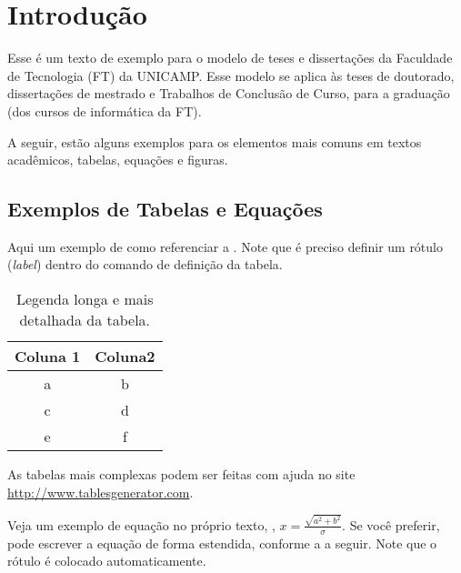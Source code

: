 \chapter{Introdução}\label{chp:Introducao}

Esse é um texto de exemplo para o modelo de teses e dissertações da Faculdade de Tecnologia (FT) da UNICAMP. Esse modelo se aplica às teses de doutorado, dissertações de mestrado e Trabalhos de Conclusão de Curso, para a graduação (dos cursos de informática da FT).

A seguir, estão alguns exemplos para os elementos mais comuns em textos acadêmicos, \ie tabelas, equações e figuras. 

\section{Exemplos de Tabelas e Equações}\label{sec:exemplostabelas}
Aqui um exemplo de como referenciar a . Note que é preciso definir um rótulo (\textit{label}) dentro do comando de definição da tabela.

\begin{table}[!htp]
\caption[Legenda curta da tabela]{Legenda longa e mais detalhada da tabela.}
\label{tab:tabela_1}
\begin{center}
\begin{tabular}{cc}
\toprule %
Coluna 1 & Coluna2 \\ \midrule %
a & b \\
c & d \\
e & f \\\bottomrule %
\end{tabular}
\end{center}
\end{table}

As tabelas mais complexas podem ser feitas com ajuda no site \href{http://www.tablesgenerator.com}{http://www.tables\-ge\-ne\-ra\-tor.com}.

Veja um exemplo de equação no próprio texto, \eg, $x=\frac{\sqrt{a^{2}+b^{2}}}{\sigma}$.  Se você preferir, pode escrever a equação de forma estendida, conforme a  a seguir. Note que o rótulo é colocado automaticamente.

